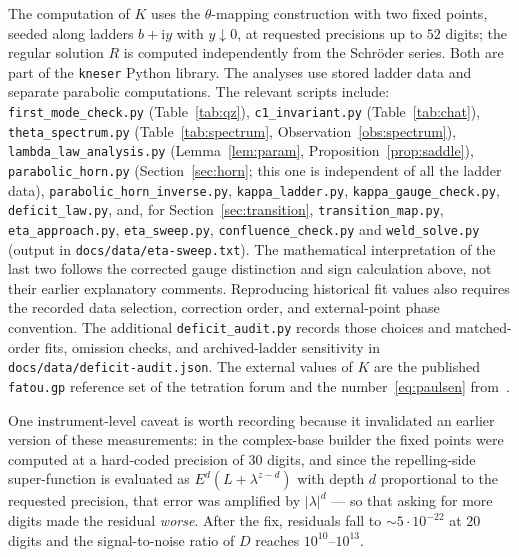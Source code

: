 \documentclass[11pt,a4paper]{article}
\theoremstyle{definition}
\newcommand{\Rr}{R}
\newcommand{\Kk}{K}
\newcommand{\ii}{\mathrm{i}}
\begin{document}
The computation of $\Kk$ uses the $\theta$-mapping construction with two fixed
points, seeded along ladders $b+\ii y$ with $y\downarrow0$, at requested
precisions up to $52$ digits; the regular solution $\Rr$ is computed
independently from the Schr\"oder series.  Both are part of the
\texttt{kneser} Python library.  The analyses use stored ladder data and separate parabolic computations.
The relevant scripts include:
\texttt{first\_mode\_check.py} (Table~\ref{tab:qz}),
\texttt{c1\_invariant.py} (Table~\ref{tab:chat}),
\texttt{theta\_spectrum.py} (Table~\ref{tab:spectrum},
Observation~\ref{obs:spectrum}),
\texttt{lambda\_law\_analysis.py} (Lemma~\ref{lem:param},
Proposition~\ref{prop:saddle}),
\texttt{parabolic\_horn.py} (Section~\ref{sec:horn}; this one is independent of
all the ladder data),
\texttt{parabolic\_horn\_inverse.py}, \texttt{kappa\_ladder.py},
\texttt{kappa\_gauge\_check.py}, \texttt{deficit\_law.py}, and, for
Section~\ref{sec:transition}, \texttt{transition\_map.py},
\texttt{eta\_approach.py}, \texttt{eta\_sweep.py}, \texttt{confluence\_check.py} and \texttt{weld\_solve.py} (output in
\texttt{docs/data/eta-sweep.txt}).
The mathematical interpretation of the last two follows the corrected
gauge distinction and sign calculation above, not their earlier explanatory
comments.  Reproducing historical fit values also requires the recorded
data selection, correction order, and external-point phase convention.
The additional \texttt{deficit\_audit.py} records those choices and matched-order
fits, omission checks, and archived-ladder sensitivity in
\texttt{docs/data/deficit-audit.json}.
The external values of $\Kk$ are the published \texttt{fatou.gp} reference set
of the tetration forum and the number~\eqref{eq:paulsen}
from~\cite{Paulsen2019}.

One instrument-level caveat is worth recording because it invalidated an earlier
version of these measurements: in the complex-base builder the fixed points were
computed at a hard-coded precision of $30$ digits, and since the repelling-side
super-function is evaluated as $E^{d}(L+\lambda^{z-d})$ with depth $d$
proportional to the requested precision, that error was amplified by
$|\lambda|^{d}$ --- so that asking for more digits made the residual
\emph{worse}.  After the fix, residuals fall to $\sim5\cdot10^{-22}$ at $20$
digits and the signal-to-noise ratio of $D$ reaches $10^{10}$--$10^{13}$.
\end{document}
